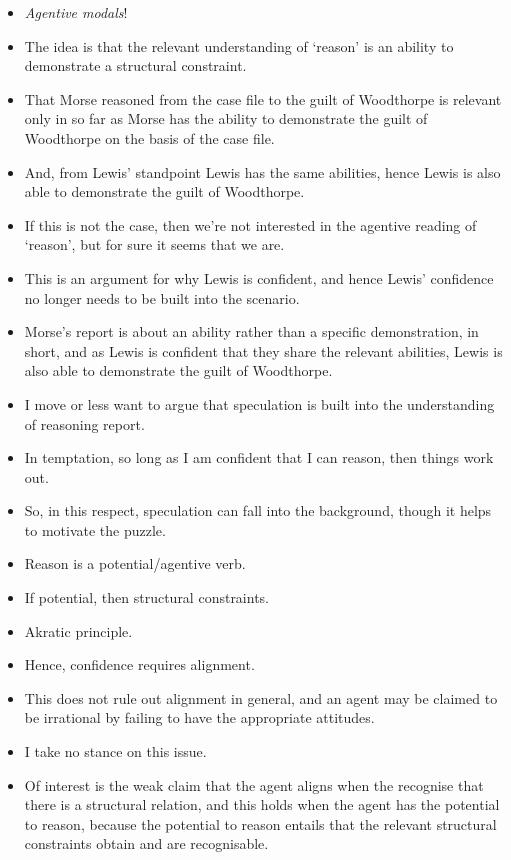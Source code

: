 \documentclass[10pt]{article}
\begin{document}
\begin{itemize}
\item \emph{Agentive modals}!
\item The idea is that the relevant understanding of `reason' is an ability to demonstrate a structural constraint.
\item That Morse reasoned from the case file to the guilt of Woodthorpe is relevant only in so far as Morse has the ability to demonstrate the guilt of Woodthorpe on the basis of the case file.
\item And, from Lewis' standpoint Lewis has the same abilities, hence Lewis is also able to demonstrate the guilt of Woodthorpe.
\item If this is not the case, then we're not interested in the agentive reading of `reason', but for sure it seems that we are.
\end{itemize}

\begin{itemize}
\item This is an argument for why Lewis is confident, and hence Lewis' confidence no longer needs to be built into the scenario.
\item Morse's report is about an ability rather than a specific demonstration, in short, and as Lewis is confident that they share the relevant abilities, Lewis is also able to demonstrate the guilt of Woodthorpe.
\end{itemize}

\begin{itemize}
\item I move or less want to argue that speculation is built into the understanding of reasoning report.
\item In temptation, so long as I am confident that I can reason, then things work out.
\item So, in this respect, speculation can fall into the background, though it helps to motivate the puzzle.
\end{itemize}

\begin{itemize}
\item Reason is a potential/agentive verb.
\item If potential, then structural constraints.
\item Akratic principle.
\item Hence, confidence requires alignment.
\end{itemize}

\begin{itemize}
\item This does not rule out alignment in general, and an agent may be claimed to be irrational by failing to have the appropriate attitudes.
\item I take no stance on this issue.
\item Of interest is the weak claim that the agent aligns when the recognise that there is a structural relation, and this holds when the agent has the potential to reason, because the potential to reason entails that the relevant structural constraints obtain and are recognisable.
\end{itemize}
\end{document}
